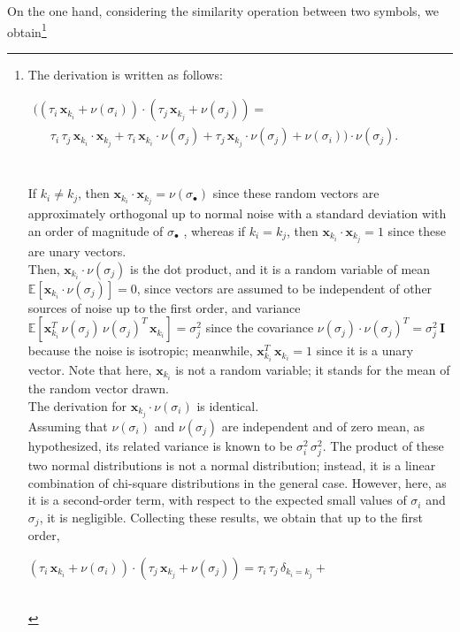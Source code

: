 \documentclass[sn-mathphys]{sn-jnl}
\newcommand{\eqline}[1]{~\vspace{0.1cm}\\\centerline{$#1$}\vspace{0.1cm}\\}
\begin{document}
\begin{appendices}
On the one hand, considering the similarity operation between two symbols, we
obtain\footnote{
The derivation is written as follows:
\eqline{\begin{array}{lc}
((\tau_i \, \mathbf{x}_{k_i} + \nu(\sigma_i)) \cdot (\tau_j \, \mathbf{x}_{k_j} + \nu(\sigma_j))  = \\
    \;\;\;\;\; \tau_i \, \tau_j \, \mathbf{x}_{k_i} \cdot \mathbf{x}_{k_j} +
    \tau_i \, \mathbf{x}_{k_i} \cdot \nu(\sigma_j) +
    \tau_j \, \mathbf{x}_{k_j} \cdot \nu(\sigma_j) +
    \nu(\sigma_i)) \cdot \nu(\sigma_j). \\
\end{array}}
If $k_i \neq k_j$, then $\mathbf{x}_{k_i} \cdot \mathbf{x}_{k_j} = \nu(\sigma_\bullet)$ since these random vectors are approximately orthogonal up to normal noise with a standard deviation with an order of magnitude of $\sigma_\bullet$ \cite{voelker_learning_2014}, whereas if $k_i = k_j$, then $\mathbf{x}_{k_i} \cdot \mathbf{x}_{k_j} = 1$ since these are unary vectors.
\\ Then, $\mathbf{x}_{k_i} \cdot \nu(\sigma_j)$ is the dot product, and it is a random variable of mean $\mathbb{E}\left[\mathbf{x}_{k_i} \cdot \nu(\sigma_j)\right] = 0$, since vectors are assumed to be independent of other sources of noise up to the first order, and variance $\mathbb{E}\left[\mathbf{x}_{k_i}^T \, \nu(\sigma_j) \, \nu(\sigma_j)^T \, \mathbf{x}_{k_i}\right] = \sigma_j^2$ since the covariance $\nu(\sigma_j) \cdot \nu(\sigma_j)^T = \sigma_j^2 \, \mathbf{I}$ because the noise is isotropic; meanwhile, $\mathbf{x}_{k_i}^T \, \mathbf{x}_{k_i}=1$ since it is a unary vector. Note that here, $\mathbf{x}_{k_i}$ is not a random variable; it stands for the mean of the random vector drawn.
\\ The derivation for $\mathbf{x}_{k_j} \cdot \nu(\sigma_i)$ is identical.
\\ Assuming that $\nu(\sigma_i)$ and $\nu(\sigma_j)$ are independent and of zero mean, as hypothesized, its related variance is known to be $\sigma_i^2 \, \sigma_j^2$. The product of these two normal distributions is not a normal distribution; instead, it is a linear combination of chi-square distributions in the general case. However, here, as it is a second-order term, with respect to the expected small values of $\sigma_i$ and $\sigma_j$, it is negligible.
Collecting these results, we obtain that up to the first order,
\eqline{(\tau_i \, \mathbf{x}_{k_i} + \nu(\sigma_i)) \cdot (\tau_j \, \mathbf{x}_{k_j} + \nu(\sigma_j)) =
  \tau_i \, \tau_j \, \delta_{k_i = k_j} +
}}
\end{appendices}
\end{document}
